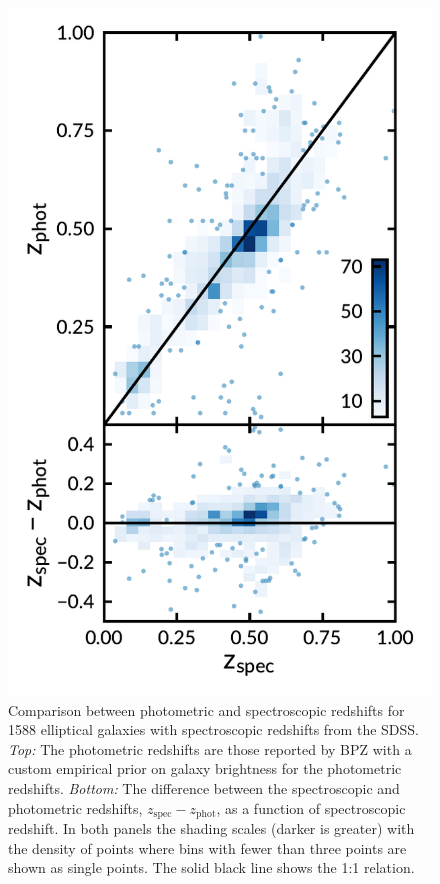 \documentclass[apj, revtex4-1]{emulateapj}
\begin{document}
\begin{figure}
	\includegraphics[width=\columnwidth]{specVSphot.pdf}
	\caption{Comparison between photometric and spectroscopic redshifts for 1588 elliptical galaxies with spectroscopic redshifts from the SDSS. \textit{Top:} The photometric redshifts are those reported by BPZ with a custom empirical prior on galaxy brightness for the photometric redshifts. \textit{Bottom:} The difference between the spectroscopic and photometric redshifts, $z_\mathrm{spec} - z_\mathrm{phot}$, as a function of spectroscopic redshift. In both panels the shading scales (darker is greater) with the density of points where bins with fewer than three points are shown as single points. The solid black line shows the 1:1 relation.}
	\label{fig:photozspecz}
\end{figure}
\end{document}
